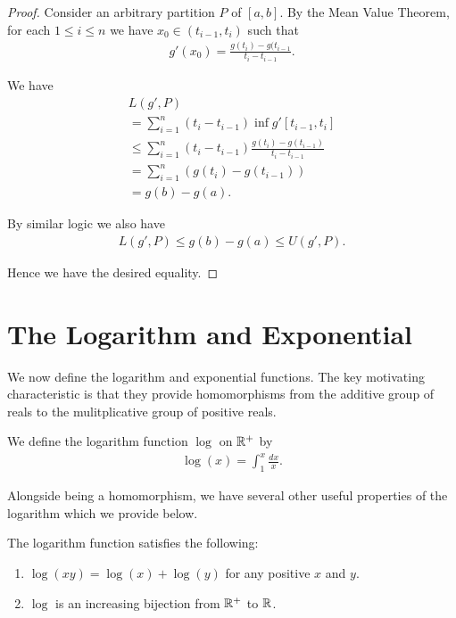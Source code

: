 \documentclass[]{article}
\begin{document}
\begin{proof}
		Consider an arbitrary partition $P$ of $[a,b]$. By the Mean Value Theorem, for each $1 \leq i \leq n$ we have $x_0 \in (t_{i-1}, t_i)$ such that
		\begin{align*}
				g'(x_0) = \frac{g(t_i) - g(t_{i-1}}{t_i - t_{i-1}}.
		\end{align*}

		We have
		\begin{align*}
				L(g',P) \\
				= \sum_{i=1}^n (t_i - t_{i-1}) \inf g'[t_{i-1}, t_i] \\
				\leq \sum_{i=1}^n (t_i - t_{i-1}) \frac{g(t_i) - g(t_{i-1})}{t_i - t_{i-1}} \\
				= \sum_{i=1}^n (g(t_i) - g(t_{i-1})) \\
				= g(b) - g(a).
		\end{align*}

		By similar logic we also have
		\begin{align*}
				L(g',P) \leq g(b) - g(a) \leq U(g',P).
		\end{align*}

		Hence we have the desired equality.
\end{proof}

\section{The Logarithm and Exponential}

We now define the logarithm and exponential functions. The key motivating characteristic is that they provide homomorphisms from the additive group of reals to the mulitplicative group of positive reals.

\begin{defi} [Logarithm]
	We define the logarithm function $\log$ on $\mathbb{R}^+$ by 
	\begin{align*}
			\log(x) = \int_1^x \frac{dx}{x}.
	\end{align*}
\end{defi}

Alongside being a homomorphism, we have several other useful properties of the logarithm which we provide below.

\begin{thm}
		The logarithm function satisfies the following:
		\begin{enumerate}
				\item $\log(xy) = \log(x) + \log(y)$ for any positive $x$ and $y$.
				\item $\log$ is an increasing bijection from $\mathbb{R}^+$ to $\mathbb{R}$.
		\end{enumerate}
\end{thm}
\end{document}
